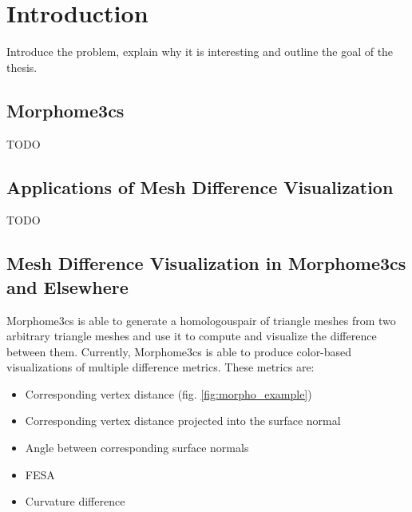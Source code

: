 \chapter*{Introduction}

Introduce the problem, explain why it is interesting and outline the goal of the thesis.

\section*{Morphome3cs}

TODO
\section*{Applications of Mesh Difference Visualization}

TODO
\section*{Mesh Difference Visualization in Morphome3cs and Elsewhere}

Morphome3cs is able to generate a homologous\footnotemark pair of triangle meshes from two arbitrary triangle meshes and use it to compute and visualize the difference between them. Currently, Morphome3cs is able to produce color-based visualizations of multiple difference metrics. These metrics are:

\begin{itemize}
\item Corresponding vertex distance (fig. \ref{fig:morpho_example})
\item Corresponding vertex distance projected into the surface normal
\item Angle between corresponding surface normals
\item FESA\footnotemark
\item Curvature difference
\end{itemize}

